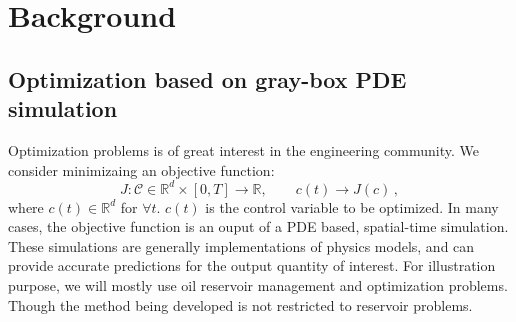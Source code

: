 \documentclass[a4paper,onecolumn]{article}
\theoremstyle{remark}
\begin{document}
\setcounter{page}{1}

$$ $$
\newpage
\tableofcontents
\newpage
\section{Background}
\label{intro}

\subsection{Optimization based on gray-box PDE simulation}
Optimization problems is of great interest in the engineering community. We consider minimizaing an
objective function:
$$
    J: \mathcal{C} \in \mathbb{R}^d\times [0,T] \rightarrow \mathbb{R}, \qquad c(t) \rightarrow J(c)\,,
$$
where $c(t) \in \mathbb{R}^d$ for $\forall t$. $c(t)$ is the control variable to be optimized.
In many cases, the objective function is an ouput of
a PDE based, spatial-time simulation. 
These simulations are generally implementations of physics models, and can provide accurate predictions for
the output quantity of interest.
For illustration purpose, we will mostly use oil reservoir management and optimization problems.
Though the method being developed is not restricted to reservoir problems.\\
\end{document}
